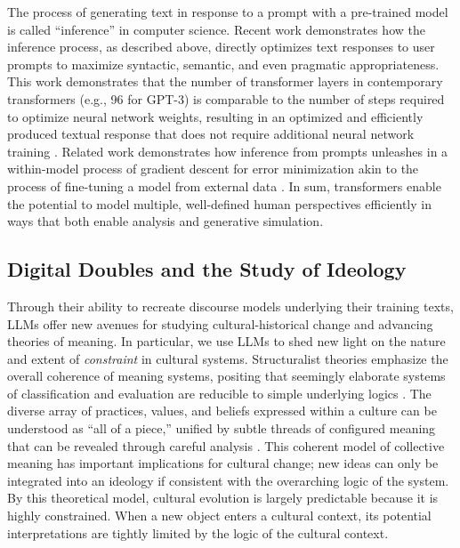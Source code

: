 \documentclass{article} %
\begin{document}
The process of generating text in response to a prompt with a
pre-trained model is called ``inference'' in computer science. Recent
work demonstrates how the inference process, as described above,
directly optimizes text responses to user prompts to maximize syntactic,
semantic, and even pragmatic appropriateness. This work demonstrates
that the number of transformer layers in contemporary transformers
(e.g., 96 for GPT-3) is comparable to the number of steps required to
optimize neural network weights, resulting in an optimized and
efficiently produced textual response that does not require additional
neural network training \parencite{Von_Oswald2023-xc}. Related work demonstrates how inference from
prompts unleashes in a within-model process of gradient descent for
error minimization akin to the process of fine-tuning a model from
external data \parencite{Dai2023-bg}. In sum, transformers enable the potential to model multiple,
well-defined human perspectives efficiently in ways that both enable
analysis and generative simulation.

\subsection*{Digital Doubles and the Study of Ideology}

Through their ability to recreate discourse models underlying their
training texts, LLMs offer new avenues for studying cultural-historical
change and advancing theories of meaning. In particular, we use LLMs to
shed new light on the nature and extent of \emph{constraint} in cultural
systems. Structuralist theories emphasize the overall coherence of
meaning systems, positing that seemingly elaborate systems of
classification and evaluation are reducible to simple underlying logics
\parencite{Douglas1966-re, Levi-Strauss1966-fw}. The diverse array of practices, values, and beliefs
expressed within a culture can be understood as ``all of a piece,''
unified by subtle threads of configured meaning that can be revealed
through careful analysis
\parencite{Mead1942-zm}. This coherent
model of collective meaning has important implications for cultural
change; new ideas can only be integrated into an ideology if consistent
with the overarching logic of the system. By this theoretical model,
cultural evolution is largely predictable because it is highly
constrained. When a new object enters a cultural context, its potential
interpretations are tightly limited by the logic of the cultural
context.
\end{document}
